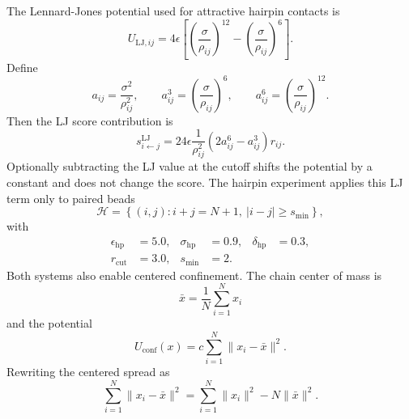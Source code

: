 \documentclass[reprint,amsmath,amssymb,aps,pra,10pt]{revtex4-2}
\begin{document}
The Lennard-Jones potential used for attractive hairpin contacts is
\begin{equation}
    U_{\mathrm{LJ},ij}
    =
    4\epsilon
    \left[
        \left(
            \frac{\sigma}
                 {\rho_{ij}}
        \right)^{12}
        -
        \left(
            \frac{\sigma}
                 {\rho_{ij}}
        \right)^6
    \right].
\end{equation}
Define
\begin{equation}
    a_{ij}
    =
    \frac{\sigma^2}
         {\rho_{ij}^2},
    \qquad
    a_{ij}^3
    =
    \left(
        \frac{\sigma}
             {\rho_{ij}}
    \right)^6,
    \qquad
    a_{ij}^6
    =
    \left(
        \frac{\sigma}
             {\rho_{ij}}
    \right)^{12}.
\end{equation}
Then the LJ score contribution is
\begin{equation}
    s^{\mathrm{LJ}}_{i\leftarrow j}
    =
    24\epsilon
    \frac{1}{\rho_{ij}^2}
    \left(
        2a_{ij}^6-a_{ij}^3
    \right)
    r_{ij}.
\end{equation}
Optionally subtracting the LJ value at the cutoff shifts the potential by a constant and does not change the score.
The hairpin experiment applies this LJ term only to paired beads
\begin{equation}
    \mathcal{H}
    =
    \left\{
        (i,j):
        i+j=N+1,
        \ |i-j|\geq s_{\min}
    \right\},
\end{equation}
with
\begin{equation}
    \begin{aligned}
        \epsilon_{\mathrm{hp}}
        &=
        5.0,
        &
        \sigma_{\mathrm{hp}}
        &=
        0.9,
        &
        \delta_{\mathrm{hp}}
        &=
        0.3,
        \\
        r_{\mathrm{cut}}
        &=
        3.0,
        &
        s_{\min}
        &=
        2.
    \end{aligned}
\end{equation}
Both systems also enable centered confinement.
The chain center of mass is
\begin{equation}
    \bar{x}
    =
    \frac{1}{N}
    \sum_{i=1}^{N}
    x_i
\end{equation}
and the potential
\begin{equation}
    U_{\mathrm{conf}}(x)
    =
    c
    \sum_{i=1}^{N}
    \|x_i-\bar{x}\|^2.
\end{equation}
Rewriting the centered spread as
\begin{equation}
    \sum_{i=1}^{N}
    \|x_i-\bar{x}\|^2
    =
    \sum_{i=1}^{N}
    \|x_i\|^2
    -
    N\|\bar{x}\|^2.
\end{equation}
\end{document}
